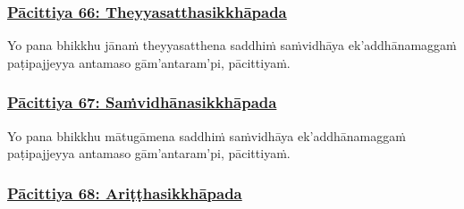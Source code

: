 \subsubsection*{\hyperref[exp66]{Pācittiya 66: Theyyasatthasikkhāpada}}
\label{pac66}

Yo pana bhikkhu jānaṁ theyyasatthena saddhiṁ saṁvidhāya ek'addhānamaggaṁ paṭipajjeyya antamaso gām'antaram'pi, pācittiyaṁ.



\subsubsection*{\hyperref[exp67]{Pācittiya 67: Saṁvidhānasikkhāpada}}
\label{pac67}

Yo pana bhikkhu mātugāmena saddhiṁ saṁvidhāya ek'addhānamaggaṁ paṭipajjeyya antamaso gām'antaram'pi, pācittiyaṁ.



\subsubsection*{\hyperref[exp68]{Pācittiya 68: Ariṭṭhasikkhāpada}}
\label{pac68}

